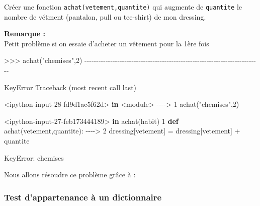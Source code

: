 \documentclass[
]{article}
\newenvironment{Shaded}{}{}
\newcommand{\BuiltInTok}[1]{#1}
\newcommand{\DecValTok}[1]{\textcolor[rgb]{0.25,0.63,0.44}{#1}}
\newcommand{\KeywordTok}[1]{\textcolor[rgb]{0.00,0.44,0.13}{\textbf{#1}}}
\newcommand{\NormalTok}[1]{#1}
\newcommand{\OperatorTok}[1]{\textcolor[rgb]{0.40,0.40,0.40}{#1}}
\newcommand{\PreprocessorTok}[1]{\textcolor[rgb]{0.74,0.48,0.00}{#1}}
\newcommand{\StringTok}[1]{\textcolor[rgb]{0.25,0.44,0.63}{#1}}
\begin{document}
Créer une fonction \texttt{achat(vetement,quantite)} qui augmente de
\texttt{quantite} le nombre de vétment (pantalon, pull ou tee-shirt) de
mon dressing.

\textbf{Remarque :}\\
Petit problème si on essaie d'acheter un vêtement pour la 1ère fois

\begin{Shaded}
\begin{Highlighting}[]
\OperatorTok{\textgreater{}\textgreater{}\textgreater{}}\NormalTok{ achat(}\StringTok{"chemises"}\NormalTok{,}\DecValTok{2}\NormalTok{)}
    \OperatorTok{{-}{-}{-}{-}{-}{-}{-}{-}{-}{-}{-}{-}{-}{-}{-}{-}{-}{-}{-}{-}{-}{-}{-}{-}{-}{-}{-}{-}{-}{-}{-}{-}{-}{-}{-}{-}{-}{-}{-}{-}{-}{-}{-}{-}{-}{-}{-}{-}{-}{-}{-}{-}{-}{-}{-}{-}{-}{-}{-}{-}{-}{-}{-}{-}{-}{-}{-}{-}{-}{-}{-}{-}{-}{-}{-}}

    \PreprocessorTok{KeyError}\NormalTok{                                  Traceback (most recent call last)}

    \OperatorTok{\textless{}}\NormalTok{ipython}\OperatorTok{{-}}\BuiltInTok{input}\OperatorTok{{-}}\DecValTok{28}\OperatorTok{{-}}\NormalTok{fd9d1ac5f62d}\OperatorTok{\textgreater{}} \KeywordTok{in} \OperatorTok{\textless{}}\NormalTok{module}\OperatorTok{\textgreater{}}
    \OperatorTok{{-}{-}{-}{-}\textgreater{}} \DecValTok{1}\NormalTok{ achat(}\StringTok{"chemises"}\NormalTok{,}\DecValTok{2}\NormalTok{)}
    

    \OperatorTok{\textless{}}\NormalTok{ipython}\OperatorTok{{-}}\BuiltInTok{input}\OperatorTok{{-}}\DecValTok{27}\OperatorTok{{-}}\NormalTok{feb173444189}\OperatorTok{\textgreater{}} \KeywordTok{in}\NormalTok{ achat(habit)}
          \DecValTok{1} \KeywordTok{def}\NormalTok{ achat(vetement,quantite):}
    \OperatorTok{{-}{-}{-}{-}\textgreater{}} \DecValTok{2}\NormalTok{     dressing[vetement] }\OperatorTok{=}\NormalTok{ dressing[vetement] }\OperatorTok{+}\NormalTok{ quantite}
    

    \PreprocessorTok{KeyError}\NormalTok{: }\StringTok{\textquotesingle{}chemises\textquotesingle{}}
\end{Highlighting}
\end{Shaded}

Nous allons résoudre ce problème grâce à :

\hypertarget{test-dappartenance-uxe0-un-dictionnaire}{%
\subsubsection{Test d'appartenance à un
dictionnaire}\label{test-dappartenance-uxe0-un-dictionnaire}}
\end{document}
